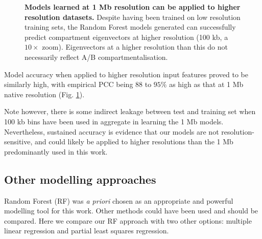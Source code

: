 \documentclass[a4paper,11pt,oneside]{book}
\begin{document}
\begin{figure}
\begin{center}
\captionsetup{width=\textwidth} 
\caption{ {\bf Models learned at 1 Mb resolution can be applied to higher resolution datasets. }
Despite having been trained on low resolution training sets, the Random Forest models generated can successfully predict compartment eigenvectors at higher resolution (100 kb, a $10\times$ zoom). Eigenvectors at a higher resolution than this do not necessarily reflect A/B compartmentalisation.
}\label{fig:100kb}
\end{center} 
\end{figure} 

Model accuracy when applied to higher resolution input features proved to be similarly high, with empirical PCC being $88$ to $95\%$ as high as that at 1 Mb native resolution (Fig. \ref{fig:100kb}).

Note however, there is some indirect leakage between test and training set when 100 kb bins have been used in aggregate in learning the 1 Mb models. Nevertheless, sustained accuracy is evidence that our models are not resolution-sensitive, and could likely be applied to higher resolutions than the 1 Mb predominantly used in this work.

\subsection{Other modelling approaches}

Random Forest (RF) was \emph{a priori} chosen as an appropriate and powerful modelling tool for this work. Other methods could have been used and should be compared. Here we compare our RF approach with two other options: multiple linear regression and partial least squares regression.
\end{document}
